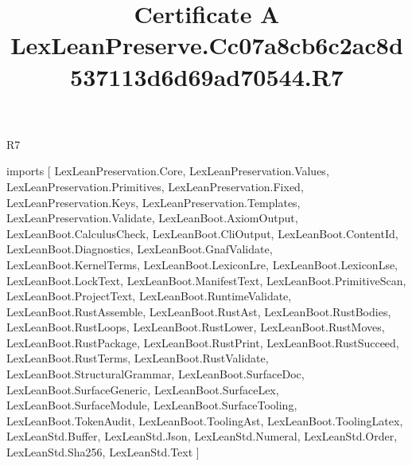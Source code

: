 \begin{lexlean}{R7}
\title{Certificate A LexLeanPreserve.Cc07a8cb6c2ac8d537113d6d69ad70544.R7}
\begin{coremodule}
imports [
  LexLeanPreservation.Core,
  LexLeanPreservation.Values,
  LexLeanPreservation.Primitives,
  LexLeanPreservation.Fixed,
  LexLeanPreservation.Keys,
  LexLeanPreservation.Templates,
  LexLeanPreservation.Validate,
  LexLeanBoot.AxiomOutput,
  LexLeanBoot.CalculusCheck,
  LexLeanBoot.CliOutput,
  LexLeanBoot.ContentId,
  LexLeanBoot.Diagnostics,
  LexLeanBoot.GnafValidate,
  LexLeanBoot.KernelTerms,
  LexLeanBoot.LexiconLre,
  LexLeanBoot.LexiconLse,
  LexLeanBoot.LockText,
  LexLeanBoot.ManifestText,
  LexLeanBoot.PrimitiveScan,
  LexLeanBoot.ProjectText,
  LexLeanBoot.RuntimeValidate,
  LexLeanBoot.RustAssemble,
  LexLeanBoot.RustAst,
  LexLeanBoot.RustBodies,
  LexLeanBoot.RustLoops,
  LexLeanBoot.RustLower,
  LexLeanBoot.RustMoves,
  LexLeanBoot.RustPackage,
  LexLeanBoot.RustPrint,
  LexLeanBoot.RustSucceed,
  LexLeanBoot.RustTerms,
  LexLeanBoot.RustValidate,
  LexLeanBoot.StructuralGrammar,
  LexLeanBoot.SurfaceDoc,
  LexLeanBoot.SurfaceGeneric,
  LexLeanBoot.SurfaceLex,
  LexLeanBoot.SurfaceModule,
  LexLeanBoot.SurfaceTooling,
  LexLeanBoot.TokenAudit,
  LexLeanBoot.ToolingAst,
  LexLeanBoot.ToolingLatex,
  LexLeanStd.Buffer,
  LexLeanStd.Json,
  LexLeanStd.Numeral,
  LexLeanStd.Order,
  LexLeanStd.Sha256,
  LexLeanStd.Text
]


\end{coremodule}
\end{lexlean}
